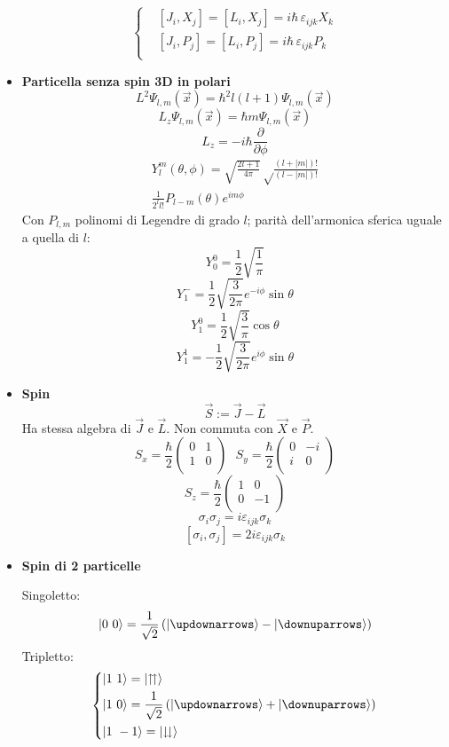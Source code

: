 \documentclass{article}
\DeclarePairedDelimiter\ket{\lvert}{\rangle}
\begin{document}
\begin{small}
\begin{multicols*}{3}
\begin{itemize}[leftmargin=*]
		\[
			\left\{\begin{aligned}
				&\left[J_i, X_j\right] = \left[L_i,X_j\right] = i\hbar \,\varepsilon _{ijk} X_k\\
				&\left[J_i, P_j\right] = \left[L_i,P_j\right] = i\hbar \,\varepsilon _{ijk} P_k\\
			\end{aligned}\right.
		\]
	\item \textbf{Particella senza spin 3D in polari}
		\[L^2 \Psi _{l,m}(\vec{x}) = \hbar ^2 l(l+1) \Psi _{l,m}(\vec{x})\]
		\[L_z \Psi _{l,m}(\vec{x}) = \hbar m \Psi _{l,m}(\vec{x})\]
		\[L_z = -i\hbar \frac{\partial}{\partial \phi }\]
		\begin{align*}Y_l^m(\theta ,\phi ) = \sqrt{\frac{2l+1}{4\pi }}\sqrt\frac{(l+|m|)!}{\left(l-|m|\right)!}\\\frac{1}{2^ll!}P_{l-m}(\theta ) e^{im\phi }\end{align*}
		Con $P_{l,m}$ polinomi di Legendre di grado $l$; parità dell'armonica sferica uguale a quella di $l$:
		\[Y_0^0 = \frac{1}{2}\sqrt{\frac{1}{\pi }}\]
		\[Y_1^- = \frac{1}{2}\sqrt{\frac{3}{2\pi }}e^{-i\phi }\sin\theta \]
		\[Y_1^0 = \frac{1}{2}\sqrt{\frac{3}{\pi }}\cos\theta \]
		\[Y_1^1 = -\frac{1}{2}\sqrt{\frac{3}{2\pi }} e^{i\phi }\sin\theta \]
	\item \textbf{Spin}
		\[\vec{S} := \vec{J}-\vec{L}\]
		Ha stessa algebra di $\vec{J}$ e $\vec{L}$. Non commuta con $\vec{X}$ e $\vec{P}$.
		\[S_x = \frac{\hbar }{2}
			\begin{pmatrix}
				0&1\\
				1&0\\
			\end{pmatrix}
			\hspace{8pt}
		S_y = \frac{\hbar }{2}
			\begin{pmatrix}
				0&-i\\
				i&0\\
			\end{pmatrix}
		\]
		\[S_z = \frac{\hbar }{2}
			\begin{pmatrix}
				1&0\\
				0&-1\\
			\end{pmatrix}
		\]
		\[\sigma _i\sigma _j = i\varepsilon _{ijk}\sigma _k\]
		\[\left[\sigma _i,\sigma _j\right] = 2i\varepsilon _{ijk}\sigma _k\]

	\item \textbf{Spin di 2 particelle}
		
		Singoletto:
		\[\ket*{0\ 0} = \frac{1}{\sqrt{2}} \left(\ket*{\updownarrows } - \ket*{\downuparrows }\right) \]
		Tripletto:
		\[
			\left\{\begin{aligned}
				&\ket*{1\ 1} = \ket*{\upuparrows }\\
				&\ket*{1\ 0} = \frac{1}{\sqrt{2}}\left(\ket*{\updownarrows } + \ket*{\downuparrows }\right)\\
				&\ket*{1\ -1} = \ket*{\downdownarrows }\\
			\end{aligned}\right.
		\]


\end{itemize}
\end{multicols*}
\end{small}
\end{document}
